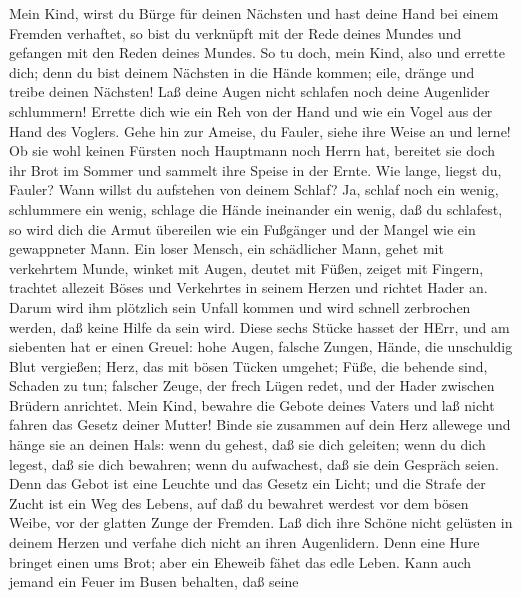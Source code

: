  Mein Kind, wirst du Bürge für deinen Nächsten und hast
deine Hand bei einem Fremden verhaftet,  so bist du
verknüpft mit der Rede deines Mundes und gefangen mit den Reden deines
Mundes.  So tu doch, mein Kind, also und errette dich; denn
du bist deinem Nächsten in die Hände kommen; eile, dränge und treibe
deinen Nächsten!  Laß deine Augen nicht schlafen noch deine
Augenlider schlummern!  Errette dich wie ein Reh von der
Hand und wie ein Vogel aus der Hand des Voglers.  Gehe hin
zur Ameise, du Fauler, siehe ihre Weise an und lerne!  Ob
sie wohl keinen Fürsten noch Hauptmann noch Herrn hat, 
bereitet sie doch ihr Brot im Sommer und sammelt ihre Speise in der
Ernte.  Wie lange, liegst du, Fauler? Wann willst du
aufstehen von deinem Schlaf?  Ja, schlaf noch ein wenig,
schlummere ein wenig, schlage die Hände ineinander ein wenig, daß du
schlafest,  so wird dich die Armut übereilen wie ein
Fußgänger und der Mangel wie ein gewappneter Mann.  Ein
loser Mensch, ein schädlicher Mann, gehet mit verkehrtem Munde,
 winket mit Augen, deutet mit Füßen, zeiget mit Fingern,
 trachtet allezeit Böses und Verkehrtes in seinem Herzen
und richtet Hader an.  Darum wird ihm plötzlich sein Unfall
kommen und wird schnell zerbrochen werden, daß keine Hilfe da sein wird.
 Diese sechs Stücke hasset der HErr, und am siebenten hat
er einen Greuel:  hohe Augen, falsche Zungen, Hände, die
unschuldig Blut vergießen;  Herz, das mit bösen Tücken
umgehet; Füße, die behende sind, Schaden zu tun;  falscher
Zeuge, der frech Lügen redet, und der Hader zwischen Brüdern anrichtet.
 Mein Kind, bewahre die Gebote deines Vaters und laß nicht
fahren das Gesetz deiner Mutter!  Binde sie zusammen auf
dein Herz allewege und hänge sie an deinen Hals:  wenn du
gehest, daß sie dich geleiten; wenn du dich legest, daß sie dich
bewahren; wenn du aufwachest, daß sie dein Gespräch seien. 
Denn das Gebot ist eine Leuchte und das Gesetz ein Licht; und die Strafe
der Zucht ist ein Weg des Lebens,  auf daß du bewahret
werdest vor dem bösen Weibe, vor der glatten Zunge der Fremden.
 Laß dich ihre Schöne nicht gelüsten in deinem Herzen und
verfahe dich nicht an ihren Augenlidern.  Denn eine Hure
bringet einen ums Brot; aber ein Eheweib fähet das edle Leben.
 Kann auch jemand ein Feuer im Busen behalten, daß seine

